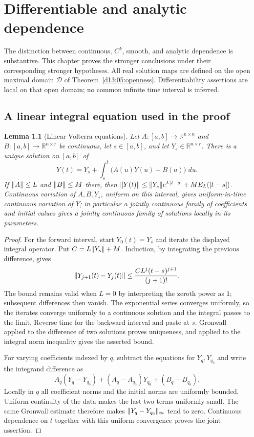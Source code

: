 \documentclass[11pt,oneside]{book}
\newtheorem{lemma}[theorem]{Lemma}
\theoremstyle{definition}
\theoremstyle{remark}\newtheorem{remark}[theorem]{Remark}
\newcommand{\R}{\mathbb R}\newcommand{\C}{\mathbb C}
\newcommand{\dd}{\,d}\newcommand{\id}{\operatorname{id}}
\begin{document}
\chapter{Differentiable and analytic dependence}\label{ch:d13-06}

The distinction between continuous, $C^k$, smooth, and analytic dependence
is substantive. This chapter proves the stronger conclusions under their
corresponding stronger hypotheses. All real solution maps are defined on
the open maximal domain $\mathcal D$ of Theorem~\ref{d13:05:openness}.
Differentiability assertions are local on that open domain; no common
infinite time interval is inferred.

\section{A linear integral equation used in the proof}
\begin{lemma}[Linear Volterra equations]\label{d13:06:linear-volterra}
Let $A:[a,b]\to\R^{n\times n}$ and
$B:[a,b]\to\R^{n\times r}$ be continuous, let $s\in[a,b]$, and
let $Y_s\in\R^{n\times r}$. There is a unique solution on $[a,b]$ of
\[
 Y(t)=Y_s+\int_s^t\bigl(A(u)Y(u)+B(u)\bigr)\,\dd u.
\]
If $\lVert A\rVert\leq L$ and $\lVert B\rVert\leq M$ there, then
$\lVert Y(t)\rVert\leq\lVert Y_s\rVert e^{L|t-s|}+ME_L(|t-s|)$.
Continuous variation of $A,B,Y_s$, uniform on this interval, gives
uniform-in-time continuous variation of $Y$; in particular a jointly
continuous family of coefficients and initial values gives a jointly
continuous family of solutions locally in its parameters.
\end{lemma}
\begin{proof}
For the forward interval, start $Y_0(t)=Y_s$ and iterate the displayed
integral operator. Put $C=L\lVert Y_s\rVert+M$. Induction, by integrating
the previous difference, gives
\[
 \lVert Y_{j+1}(t)-Y_j(t)\rVert
       \leq \frac{CL^j(t-s)^{j+1}}{(j+1)!}.
\]
The bound remains valid when $L=0$ by interpreting the zeroth power
as $1$; subsequent differences then vanish. The exponential series
converges uniformly, so the iterates converge uniformly to a continuous
solution and the integral passes to the limit. Reverse time for the
backward interval and paste at $s$. Gronwall applied to the difference
of two solutions proves uniqueness, and applied to the integral norm
inequality gives the asserted bound.

For varying coefficients indexed by $q$, subtract the equations for
$Y_q,Y_{q_0}$ and write the integrand difference as
\[
 A_q(Y_q-Y_{q_0})+(A_q-A_{q_0})Y_{q_0}+(B_q-B_{q_0}).
\]
Locally in $q$ all coefficient norms and the initial norms are uniformly
bounded. Uniform continuity of the data makes the last two terms
uniformly small. The same Gronwall estimate therefore makes
$\lVert Y_q-Y_{q_0}\rVert_\infty$ tend to zero. Continuous dependence on
$t$ together with this uniform convergence proves the joint assertion.
\end{proof}
\end{document}
